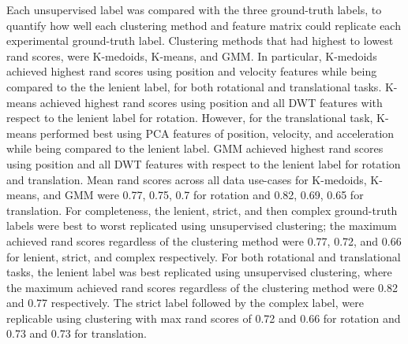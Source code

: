 \documentclass{ieeeaccess}
\begin{document}
Each unsupervised label was compared with the three ground-truth labels, to quantify how well each clustering method and feature matrix could replicate each experimental ground-truth label. Clustering methods that had highest to lowest rand scores, were K-medoids, K-means, and GMM. In particular, K-medoids achieved highest rand scores using position and velocity features while being compared to the the lenient label, for both rotational and translational tasks. K-means achieved highest rand scores using position and all DWT features with respect to the lenient label for rotation. However, for the translational task, K-means performed best using PCA features of position, velocity, and acceleration while being compared to the lenient label. GMM achieved highest rand scores using position and all DWT features with respect to the lenient label for rotation and translation. Mean rand scores across all data use-cases for K-medoids, K-means, and GMM were 0.77, 0.75, 0.7 for rotation and 0.82, 0.69, 0.65 for translation. For completeness, the lenient, strict, and then complex ground-truth labels were best to worst replicated using unsupervised clustering; the maximum achieved rand scores regardless of the clustering method were 0.77, 0.72, and 0.66 for lenient, strict, and complex respectively. For both rotational and translational tasks, the lenient label was best replicated using unsupervised clustering, where the maximum achieved rand scores regardless of the clustering method were 0.82 and 0.77 respectively. The strict label followed by the complex label, were replicable  using clustering with max rand scores of 0.72 and 0.66 for rotation and 0.73 and 0.73 for translation.
\end{document}
